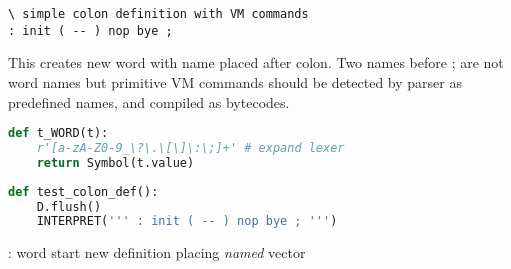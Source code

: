 \clearpage{}

\begin{lstlisting}[language=Forth]
\ simple colon definition with VM commands
: init ( -- ) nop bye ;
\end{lstlisting}

\noindent This  creates new word with name placed after
colon. Two names before ; are not word names but primitive VM commands should be
detected by parser as predefined names, and compiled as bytecodes.

\begin{lstlisting}[language=Python]
def t_WORD(t):
    r'[a-zA-Z0-9_\?\.\[\]\:\;]+' # expand lexer
    return Symbol(t.value)
\end{lstlisting}

\pg 

\begin{lstlisting}[language=Python]
def test_colon_def():
    D.flush()
    INTERPRET(''' : init ( -- ) nop bye ; ''')
\end{lstlisting}

\medskip\noindent
: word start new definition placing \emph{named} vector